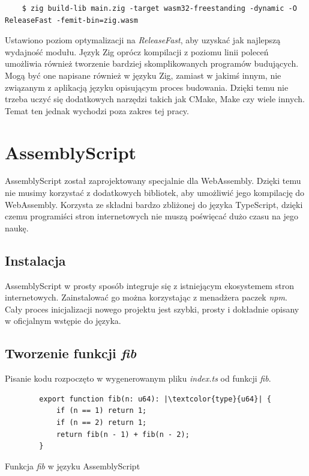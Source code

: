 \documentclass[language=polish,type=master]{aghmodern}
\begin{document}
\begin{verbatim}
    $ zig build-lib main.zig -target wasm32-freestanding -dynamic -O ReleaseFast -femit-bin=zig.wasm
\end{verbatim}

Ustawiono poziom optymalizacji na \emph{ReleaseFast}, aby uzyskać jak najlepszą wydajność modułu.
Język Zig oprócz kompilacji z poziomu linii poleceń umożliwia również tworzenie bardziej skomplikowanych programów budujących.
Mogą być one napisane również w języku Zig, zamiast w jakimś innym, nie związanym z aplikacją języku opisującym proces budowania.
Dzięki temu nie trzeba uczyć się dodatkowych narzędzi takich jak CMake, Make czy wiele innych.
Temat ten jednak wychodzi poza zakres tej pracy.

\section{AssemblyScript}
AssemblyScript został zaprojektowany specjalnie dla WebAssembly.
Dzięki temu nie musimy korzystać z dodatkowych bibliotek, aby umożliwić jego kompilację do WebAssembly.
Korzysta ze składni bardzo zbliżonej do języka TypeScript, dzięki czemu programiści stron internetowych nie muszą poświęcać dużo czasu na jego naukę.

\subsection{Instalacja}
AssemblyScript w prosty sposób integruje się z istniejącym ekosystemem stron internetowych.
Zainstalować go można korzystając z menadżera paczek \emph{npm}.
Cały proces inicjalizacji nowego projektu jest szybki, prosty i dokładnie opisany w oficjalnym wstępie do języka\footnotemark{}.

\subsection{Tworzenie funkcji \emph{fib}}
Pisanie kodu rozpoczęto w wygenerowanym pliku \emph{index.ts} od funkcji \emph{fib}.

\begin{listing}[H]
    \begin{verbatim}
        export function fib(n: u64): |\textcolor{type}{u64}| {
            if (n == 1) return 1;
            if (n == 2) return 1;
            return fib(n - 1) + fib(n - 2);
        }
    \end{verbatim}
    \caption{Funkcja \emph{fib} w języku AssemblyScript}
\end{listing}
\end{document}
